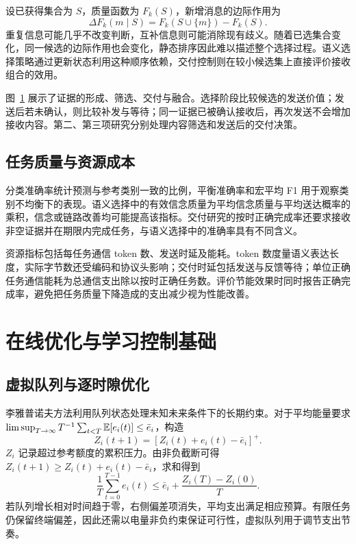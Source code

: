 设已获得集合为 $S$，质量函数为 $F_k(S)$，新增消息的边际作用为
\begin{equation}
\Delta F_k(m\mid S)=F_k(S\cup\{m\})-F_k(S).
\label{eq:base:marginal}
\end{equation}
重复信息可能几乎不改变判断，互补信息则可能消除现有歧义。随着已选集合变化，同一候选的边际作用也会变化，静态排序因此难以描述整个选择过程。语义选择策略通过更新状态利用这种顺序依赖，交付控制则在较小候选集上直接评价接收组合的效用。

\begin{figure}[htbp]
\centering

\label{fig:base:semantic-pipeline}
\end{figure}
图~\ref{fig:base:semantic-pipeline} 展示了证据的形成、筛选、交付与融合。选择阶段比较候选的发送价值；发送后若未确认，则比较补发与等待；同一证据已被确认接收后，再次发送不会增加接收内容。第二、第三项研究分别处理内容筛选和发送后的交付决策。

\subsection{任务质量与资源成本}

分类准确率统计预测与参考类别一致的比例，平衡准确率和宏平均 F1 用于观察类别不均衡下的表现。语义选择中的有效信念质量为平均信念质量与平均送达概率的乘积，信念或链路改善均可能提高该指标。交付研究的按时正确完成率还要求接收非空证据并在期限内完成任务，与语义选择中的准确率具有不同含义。

资源指标包括每任务通信 token 数、发送时延及能耗。token 数度量语义表达长度，实际字节数还受编码和协议头影响；交付时延包括发送与反馈等待；单位正确任务通信能耗为总通信支出除以按时正确任务数。评价节能效果时同时报告正确完成率，避免把任务质量下降造成的支出减少视为性能改善。

\section{在线优化与学习控制基础}
\subsection{虚拟队列与逐时隙优化}

李雅普诺夫方法利用队列状态处理未知未来条件下的长期约束\cite{neely2010stochastic}。对于平均能量要求 $\limsup_{T\rightarrow\infty}T^{-1}\sum_{t<T}\mathbb{E}[e_i(t)]\le\bar e_i$，构造
\begin{equation}
Z_i(t+1)=\left[Z_i(t)+e_i(t)-\bar e_i\right]^+.
\label{eq:base:virtual-queue}
\end{equation}
$Z_i$ 记录超过参考额度的累积压力。由非负截断可得 $Z_i(t+1)\ge Z_i(t)+e_i(t)-\bar e_i$，求和得到
\begin{equation}
\frac{1}{T}\sum_{t=0}^{T-1}e_i(t)
\le \bar e_i+\frac{Z_i(T)-Z_i(0)}{T}.
\label{eq:base:finite-budget}
\end{equation}
若队列增长相对时间趋于零，右侧偏差项消失，平均支出满足相应预算。有限任务仍保留终端偏差，因此还需以电量非负约束保证可行性，虚拟队列用于调节支出节奏。

